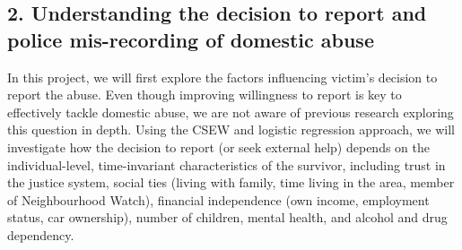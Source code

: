 \documentclass[11pt, a4paper]{article}
\begin{document}













\subsection*{2. Understanding the decision to report and police mis-recording of domestic abuse}

In this project, we will first explore the factors influencing victim's decision to report the abuse. Even though improving willingness to report is key to effectively tackle domestic abuse, we are not aware of previous research exploring this question in depth. Using the CSEW and logistic regression approach, we will investigate how the decision to report (or seek external help) depends on the individual-level, time-invariant characteristics of the survivor, including trust in the justice system, social ties (living with family, time living in the area, member of Neighbourhood Watch), financial independence (own income, employment status, car ownership), number of children, mental health, and alcohol and drug dependency. 
\end{document}
